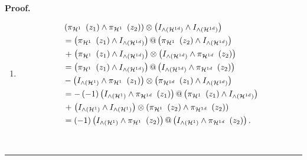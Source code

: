 \documentclass[aps,preprint]{revtex4}%
\newenvironment{proof}[1][Proof]{\noindent\textbf{#1.} }{\ \rule{0.5em}{0.5em}}
\begin{document}
\begin{proof}
\begin{enumerate}
\item
\begin{align}
&  \left(  \pi_{\mathcal{H}^{1}\mathcal{\ }}\left(  z_{1}\right)  \wedge
\pi_{\mathcal{H}^{1}\mathcal{\ }}\left(  z_{2}\right)  \right)  \otimes\left(
I_{{\huge \wedge}\left(  \mathcal{H}^{1d}\right)  }\wedge I_{{\huge \wedge
}\left(  \mathcal{H}^{1d}\right)  }\right) \\
&  =\left(  \pi_{\mathcal{H}^{1}\mathcal{\ }}\left(  z_{1}\right)  \wedge
I_{{\huge \wedge}\left(  \mathcal{H}^{1d}\right)  }\right)  @\left(
\pi_{\mathcal{H}^{1}\mathcal{\ }}\left(  z_{2}\right)  \wedge I_{{\huge \wedge
}\left(  \mathcal{H}^{1d}\right)  }\right) \\
&  \left.  +\right.  \left(  \pi_{\mathcal{H}^{1}\mathcal{\ }}\left(
z_{1}\right)  \wedge I_{{\huge \wedge}\left(  \mathcal{H}^{1d}\right)
}\right)  \otimes\left(  I_{{\huge \wedge}\left(  \mathcal{H}^{1d}\right)
}\wedge\pi_{\mathcal{H}^{1d}\mathcal{\ }}\left(  z_{2}\right)  \right) \\
&  =\left(  \pi_{\mathcal{H}^{1}\mathcal{\ }}\left(  z_{1}\right)  \wedge
I_{{\huge \wedge}\left(  \mathcal{H}^{1d}\right)  }\right)  @\left(
I_{{\huge \wedge}\left(  \mathcal{H}^{1d}\right)  }\wedge\pi_{\mathcal{H}%
^{1d}\mathcal{\ }}\left(  z_{2}\right)  \right) \\
&  -\left(  I_{{\huge \wedge}\left(  \mathcal{H}^{1}\right)  }\wedge
\pi_{\mathcal{H}^{1}\mathcal{\ }}\left(  z_{1}\right)  \right)  \otimes\left(
\pi_{\mathcal{H}^{1d}\mathcal{\ }}\left(  z_{1}\right)  \wedge
I_{{\huge \wedge}\left(  \mathcal{H}^{1d}\right)  }\right) \\
&  =-\left(  -1\right)  \left(  I_{{\huge \wedge}\left(  \mathcal{H}%
^{1}\right)  }\wedge\pi_{\mathcal{H}^{1d}\mathcal{\ }}\left(  z_{1}\right)
\right)  @\left(  \pi_{\mathcal{H}^{1}\mathcal{\ }}\left(  z_{1}\right)
\wedge I_{{\huge \wedge}\left(  \mathcal{H}^{1d}\right)  }\right) \\
&  \left.  +\right.  \left(  I_{{\huge \wedge}\left(  \mathcal{H}^{1}\right)
}\wedge I_{{\huge \wedge}\left(  \mathcal{H}^{1}\right)  }\right)
\otimes\left(  \pi_{\mathcal{H}^{1}\mathcal{\ }}\left(  z_{2}\right)
\wedge\pi_{\mathcal{H}^{1d}\mathcal{\ }}\left(  z_{2}\right)  \right) \\
&  =\left(  -1\right)  \left(  I_{{\huge \wedge}\left(  \mathcal{H}%
^{1}\right)  }\wedge\pi_{\mathcal{H}^{1}\mathcal{\ }}\left(  z_{2}\right)
\right)  @\left(  I_{{\huge \wedge}\left(  \mathcal{H}^{1}\right)  }\wedge
\pi_{\mathcal{H}^{1d}\mathcal{\ }}\left(  z_{2}\right)  \right)  .
\end{align}

\end{enumerate}
\end{proof}
\end{document}
